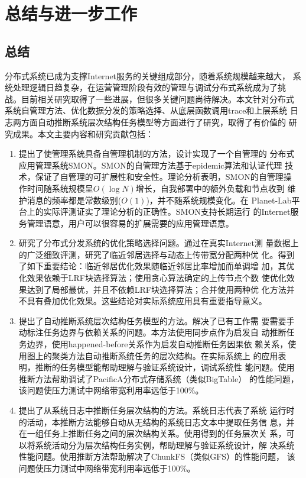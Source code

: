 \chapter{总结与进一步工作}
\label{chap:conclusion}

\section{总结}

分布式系统已成为支撑Internet服务的关键组成部分，随着系统规模越来越大，
系统处理逻辑日趋复杂，在运营管理阶段有效的管理与调试分布式系统成为了挑
战。目前相关研究取得了一些进展，但很多关键问题尚待解决。本文针对分布式
系统自管理方法、优化数据分发的策略选择、从底层函数调用trace和上层系统
日志两方面自动推断系统层次结构任务模型等方面进行了研究，取得了有价值的
研究成果。本文主要内容和研究贡献包括：

\begin{enumerate}
  
    \item 提出了使管理系统具备自管理机制的方法，设计实现了一个自管理的
    分布式应用管理系统SMON。SMON的自管理方法基于epidemic算法和认证代理
    技术，保证了自管理的可扩展性和安全性。理论分析表明，SMON的自管理操
    作时间随系统规模呈$O(\log N)$增长，自我部署中的额外负载和节点收到
    维护消息的频率都是常数级别($O(1)$)，并不随系统规模变化。在
    Planet-Lab平台上的实际评测证实了理论分析的正确性。SMON支持长期运行
    的Internet服务管理语意，用户可以很容易的扩展需要的应用管理语意。

    \item 研究了分布式分发系统的优化策略选择问题。通过在真实Internet测
    量数据上的广泛细致评测，研究了临近邻居选择与动态上传带宽分配两种优
    化。得到了如下重要结论：临近邻居优化效果随临近邻居比率增加而单调增
    加，其优化效果依赖于LRF块选择算法；使用贪心算法确定的上传节点个数
    使优化效果达到了局部最优，并且不依赖LRF块选择算法；合并使用两种优
    化方法并不具有叠加优化效果。这些结论对实际系统应用具有重要指导意义。

    \item 提出了自动推断系统层次结构任务模型的方法。解决了已有工作需
    要需要手动标注任务边界与依赖关系的问题。本方法使用同步点作为启发自
    动推断任务边界，使用happened-before关系作为启发自动推断任务因果依
    赖关系，使用图上的聚类方法自动推断系统任务的层次结构。在实际系统上
    的应用表明，推断的任务模型能帮助理解与验证系统设计，调试系统性
    能问题。使用推断方法帮助调试了PacificA分布式存储系统（类似BigTable）
    的性能问题，该问题使压力测试中网络带宽利用率远低于100\%。

    \item 提出了从系统日志中推断任务层次结构的方法。系统日志代表了系统
    运行时的活动，本推断方法能够自动从无结构的系统日志文本中提取任务信
    息，并在一组任务上推断任务之间的层次结构关系。使用得到的任务层次关
    系，可以将系统活动分为层次结构任务实例，帮助理解与验证系统设计，解
    决系统性能问题。使用推断方法帮助解决了ChunkFS（类似GFS）的性能问题，
    该问题使压力测试中网络带宽利用率远低于100\%。

\end{enumerate}

